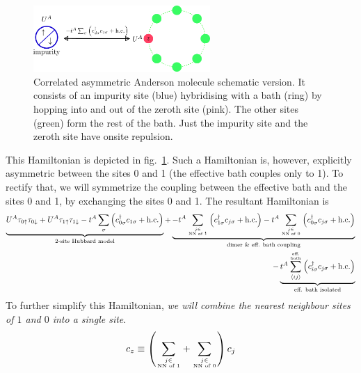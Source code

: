 \documentclass{report}
\numberwithin{equation}{section}
\begin{document}
{\begin{equation}
\begin{aligned}
 \end{aligned}\end{equation}
 \begin{figure}[htpb]
 	\centering
 	\includegraphics[width=0.6\textwidth]{../figures/gen_siam.png}
 	\caption{Correlated asymmetric Anderson molecule schematic version. It consists of an impurity site (blue) hybridising with a bath (ring) by hopping into and out of the zeroth site (pink). The other sites (green) form the rest of the bath. Just the impurity site and the zeroth site have onsite repulsion.}
 	\label{and_mol}
 \end{figure}
 This Hamiltonian is depicted in fig.~\ref{and_mol}. Such a Hamiltonian is, however, explicitly asymmetric between the sites 0 and 1 (the effective bath couples only to 1). To rectify that, we will symmetrize the coupling between the effective bath and the sites 0 and 1, by exchanging the sites 0 and 1. The resultant Hamiltonian is
 \begin{equation}\begin{aligned}
 	\underbrace{U^A\tau_{0 \uparrow}\tau_{0 \downarrow} + U^A\tau_{1 \uparrow}\tau_{1 \downarrow} - t^A\sum_{\sigma}\left(c^\dagger_{0\sigma}c_{1\sigma} + \text{h.c.}\right)}_\text{2-site Hubbard model} +\underbrace{- t^A\sum_{j \in \atop{\text{NN of 1}}}\left(c^\dagger_{1\sigma}c_{j\sigma} + \text{h.c.}\right)- t^A\sum_{j \in \atop{\text{NN of 0}}}\left(c^\dagger_{0\sigma}c_{j\sigma} + \text{h.c.}\right)}_\text{dimer \& eff. bath coupling} \\
 	- \underbrace{t^A \sum_{\left<ij \right>}^{\text{eff.} \atop{\text{bath}}}\left(c^\dagger_{i\sigma}c_{j\sigma} + \text{h.c.}\right)}_\text{eff. bath isolated}
 \end{aligned}\end{equation}
 To further simplify this Hamiltonian, \textit{we will combine the nearest neighbour sites of \(1\) and \(0\) into a single site}.
 \begin{equation}\begin{aligned}
 	c_z \equiv \left(\sum_{j \in \atop{\text{NN of 1}}} + \sum_{j \in \atop{\text{NN of 0}}}\right)c_{j}

\end{aligned}
\end{equation}}
\end{document}
